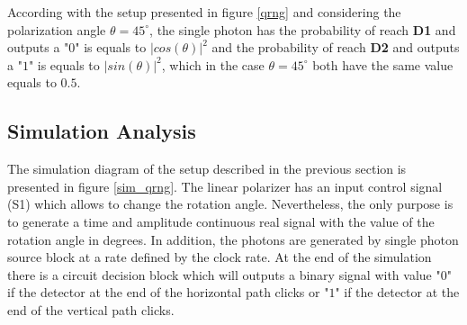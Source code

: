 According with the setup presented in figure \ref{qrng} and considering the polarization angle $\theta = 45^{\circ}$, the single photon has the probability of reach \textbf{D1} and outputs a "$0$" is equals to $|cos(\theta)|^2$ and the probability of reach \textbf{D2} and outputs a "$1$" is equals to $|sin(\theta)|^2$, which in the case $\theta = 45^{\circ}$ both have the same value equals to $0.5$.

\subsection{Simulation Analysis}
The simulation diagram of the setup described in the previous section is presented in figure \ref{sim_qrng}. The linear polarizer has an input control signal (S1) which allows to change the rotation angle. Nevertheless, the only purpose is to generate a time and amplitude continuous real signal with the value of the rotation angle in degrees. In addition, the photons are generated by single photon source block at a rate defined by the clock rate. At the end of the simulation there is a circuit decision block which will outputs a binary signal with value "$0$" \space if the detector at the end of the horizontal path clicks or "$1$" \space if the detector at the end of the vertical path clicks.

